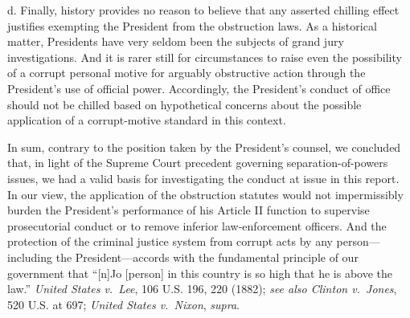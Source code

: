d. Finally, history provides no reason to believe that any asserted chilling effect justifies exempting the President from the obstruction laws.
As a historical matter, Presidents have very seldom been the subjects of grand jury investigations.
And it is rarer still for circumstances to raise even the possibility of a corrupt personal motive for arguably obstructive action through the President’s use of official power.
Accordingly, the President’s conduct of office should not be chilled based on hypothetical concerns about the possible application of a corrupt-motive standard in this context.

\hr

In sum, contrary to the position taken by the President’s counsel, we concluded that, in light of the Supreme Court precedent governing separation-of-powers issues, we had a valid basis for investigating the conduct at issue in this report.
In our view, the application of the obstruction statutes would not impermissibly burden the President’s performance of his Article II function to supervise prosecutorial conduct or to remove inferior law-enforcement officers.
And the protection of the criminal justice system from corrupt acts by any person---including the President---accords with the fundamental principle of our government that “[n]Jo [person] in this country is so high that he is above the law.”
\textit{United States v.\ Lee}, 106 U.S. 196, 220 (1882);
\textit{see also Clinton v.\ Jones}, 520 U.S. at 697;
\textit{United States v.\ Nixon}, \textit{supra}.
